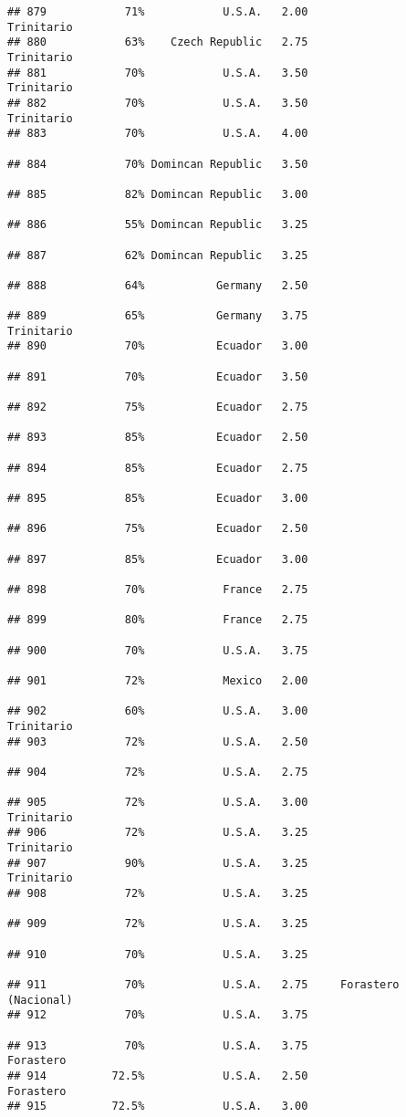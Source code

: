 \documentclass[
]{article}
\begin{document}
\begin{verbatim}
## 879            71%            U.S.A.   2.00               Trinitario
## 880            63%    Czech Republic   2.75               Trinitario
## 881            70%            U.S.A.   3.50               Trinitario
## 882            70%            U.S.A.   3.50               Trinitario
## 883            70%            U.S.A.   4.00                         
## 884            70% Domincan Republic   3.50                         
## 885            82% Domincan Republic   3.00                         
## 886            55% Domincan Republic   3.25                         
## 887            62% Domincan Republic   3.25                         
## 888            64%           Germany   2.50                         
## 889            65%           Germany   3.75               Trinitario
## 890            70%           Ecuador   3.00                         
## 891            70%           Ecuador   3.50                         
## 892            75%           Ecuador   2.75                         
## 893            85%           Ecuador   2.50                         
## 894            85%           Ecuador   2.75                         
## 895            85%           Ecuador   3.00                         
## 896            75%           Ecuador   2.50                         
## 897            85%           Ecuador   3.00                         
## 898            70%            France   2.75                         
## 899            80%            France   2.75                         
## 900            70%            U.S.A.   3.75                         
## 901            72%            Mexico   2.00                         
## 902            60%            U.S.A.   3.00               Trinitario
## 903            72%            U.S.A.   2.50                         
## 904            72%            U.S.A.   2.75                         
## 905            72%            U.S.A.   3.00               Trinitario
## 906            72%            U.S.A.   3.25               Trinitario
## 907            90%            U.S.A.   3.25               Trinitario
## 908            72%            U.S.A.   3.25                         
## 909            72%            U.S.A.   3.25                         
## 910            70%            U.S.A.   3.25                         
## 911            70%            U.S.A.   2.75     Forastero (Nacional)
## 912            70%            U.S.A.   3.75                         
## 913            70%            U.S.A.   3.75                Forastero
## 914          72.5%            U.S.A.   2.50                Forastero
## 915          72.5%            U.S.A.   3.00                         

\end{verbatim}
\end{document}
